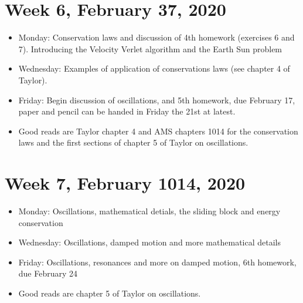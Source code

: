 \documentclass[letterpaper,10pt,english]{sphinxmanual}
\begin{document}
\section{Week 6, February 3\sphinxhyphen{}7, 2020}
\label{\detokenize{intro:week-6-february-3-7-2020}}\begin{itemize}
\item {} 
Monday: Conservation laws and discussion of 4th homework (exercises 6 and 7). Introducing the Velocity Verlet algorithm and the Earth Sun problem

\item {} 
Wednesday: Examples of application of conservations laws (see chapter 4 of Taylor).

\item {} 
Friday: Begin discussion of oscillations, and  5th homework, due February 17, paper and pencil can be handed in Friday the 21st at latest.

\item {} 
Good reads are Taylor chapter 4 and AMS chapters 10\sphinxhyphen{}14 for the conservation laws and the first sections of chapter 5 of Taylor on oscillations.

\end{itemize}


\section{Week 7, February 10\sphinxhyphen{}14, 2020}
\label{\detokenize{intro:week-7-february-10-14-2020}}\begin{itemize}
\item {} 
Monday: Oscillations, mathematical detials, the sliding block and energy conservation

\item {} 
Wednesday:  Oscillations, damped motion and more mathematical details

\item {} 
Friday: Oscillations, resonances and more on damped motion,  6th homework, due February 24

\item {} 
Good reads are chapter 5 of Taylor on oscillations.

\end{itemize}
\end{document}
